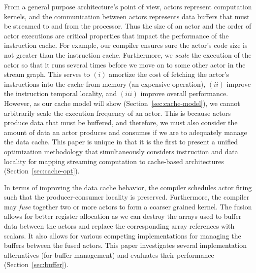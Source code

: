 From a general purpose architecture's point of view, actors represent
computation kernels, and the communication between actors represents
data buffers that must be streamed to and from the processor. Thus
the size of an actor and the
order of actor executions are critical properties that
impact the performance of the instruction cache. For example, our
compiler ensures sure the actor's code size is not
greater than the instruction cache. Furthermore, we {\it scale}
the execution of the actor so that it runs several times before we move
on to some other actor in the stream 
graph. This serves to $(i)$ amortize the cost of fetching the actor's
instructions into the cache from memory (an expensive operation), $(ii)$
improve the instruction temporal locality, and $(iii)$ improve overall
performance. However, as our cache model will show
(Section~\ref{sec:cache-model}), we 
cannot arbitrarily scale the execution frequency of an actor. This
is because actors produce data that must be buffered, and therefore,
we must also consider the amount of data an actor produces and
consumes if we are to adequately manage the data cache. This paper is unique
in that it is the first to present a unified optimization methodology
that simultaneously considers instruction and data locality for
mapping streaming computation to cache-based architectures (Section~\ref{sec:cache-opt}).

In terms of improving the data cache behavior, the compiler schedules
actor firing such that the producer-consumer locality is
preserved. Furthermore,  the compiler may {\it fuse}
together two or more actors to form a coarser grained kernel.
The fusion allows for better register allocation as we can
destroy the arrays used to buffer data between the actors and replace
the corresponding array references with scalars.  It also allows for
various competing implementations for managing the buffers between the
fused actors.  This paper investigates several implementation
alternatives (for buffer management) and evaluates their performance
(Section~\ref{sec:buffer}).


